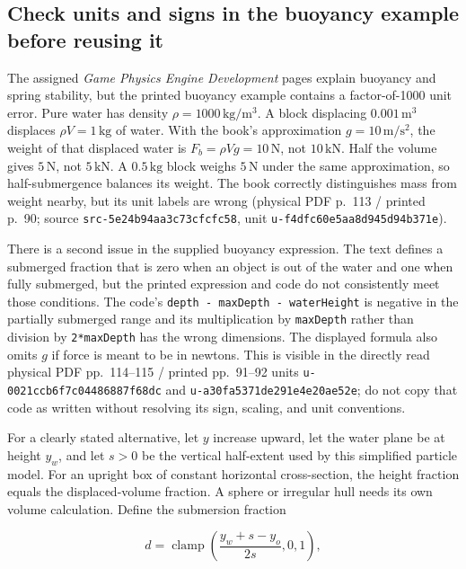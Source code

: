 \subsection{Check units and signs in the buoyancy example before reusing it}\label{check-units-and-signs-in-the-buoyancy-example-before-reusing-it}

The assigned \emph{Game Physics Engine Development} pages explain buoyancy and spring stability, but the printed buoyancy example contains a factor-of-1000 unit error. Pure water has density \(\rho=1000\,\mathrm{kg/m^3}\). A block displacing \(0.001\,\mathrm{m^3}\) displaces \(\rho V=1\,\mathrm{kg}\) of water. With the book's approximation \(g=10\,\mathrm{m/s^2}\), the weight of that displaced water is \(F_b=\rho Vg=10\,\mathrm{N}\), not \(10\,\mathrm{kN}\). Half the volume gives \(5\,\mathrm{N}\), not \(5\,\mathrm{kN}\). A \(0.5\,\mathrm{kg}\) block weighs \(5\,\mathrm{N}\) under the same approximation, so half-submergence balances its weight. The book correctly distinguishes mass from weight nearby, but its unit labels are wrong (physical PDF p.~113 / printed p.~90; source \texttt{src-5e24b94aa3c73cfcfc58}, unit \texttt{u-f4dfc60e5aa8d945d94b371e}).

There is a second issue in the supplied buoyancy expression. The text defines a submerged fraction that is zero when an object is out of the water and one when fully submerged, but the printed expression and code do not consistently meet those conditions. The code's \texttt{depth\ -\ maxDepth\ -\ waterHeight} is negative in the partially submerged range and its multiplication by \texttt{maxDepth} rather than division by \texttt{2*maxDepth} has the wrong dimensions. The displayed formula also omits \(g\) if force is meant to be in newtons. This is visible in the directly read physical PDF pp.~114--115 / printed pp.~91--92 units \texttt{u-0021ccb6f7c04486887f68dc} and \texttt{u-a30fa5371de291e4e20ae52e}; do not copy that code as written without resolving its sign, scaling, and unit conventions.

For a clearly stated alternative, let \(y\) increase upward, let the water plane be at height \(y_w\), and let \(s>0\) be the vertical half-extent used by this simplified particle model. For an upright box of constant horizontal cross-section, the height fraction equals the displaced-volume fraction. A sphere or irregular hull needs its own volume calculation. Define the submersion fraction

\[
d=\operatorname{clamp}\!\left(\frac{y_w+s-y_o}{2s},0,1\right),
\]

